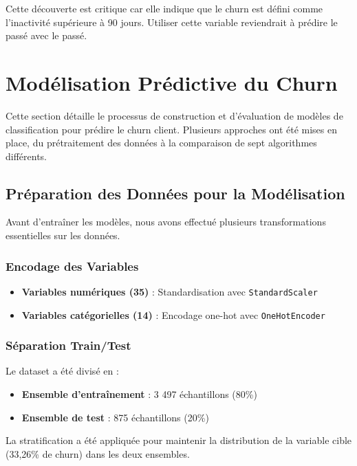 \documentclass[12pt,a4paper]{article}
\begin{document}
Cette découverte est critique car elle indique que le churn est défini comme l'inactivité supérieure à 90 jours. Utiliser cette variable reviendrait à prédire le passé avec le passé.

\section{Modélisation Prédictive du Churn}

Cette section détaille le processus de construction et d'évaluation de modèles de classification pour prédire le churn client. Plusieurs approches ont été mises en place, du prétraitement des données à la comparaison de sept algorithmes différents.

\subsection{Préparation des Données pour la Modélisation}

Avant d'entraîner les modèles, nous avons effectué plusieurs transformations essentielles sur les données.

\subsubsection{Encodage des Variables}
\begin{itemize}
    \item \textbf{Variables numériques (35)} : Standardisation avec \texttt{StandardScaler}
    \item \textbf{Variables catégorielles (14)} : Encodage one-hot avec \texttt{OneHotEncoder}
\end{itemize}

\subsubsection{Séparation Train/Test}
Le dataset a été divisé en :
\begin{itemize}
    \item \textbf{Ensemble d'entraînement} : 3 497 échantillons (80\%)
    \item \textbf{Ensemble de test} : 875 échantillons (20\%)
\end{itemize}

La stratification a été appliquée pour maintenir la distribution de la variable cible (33,26\% de churn) dans les deux ensembles.
\end{document}
